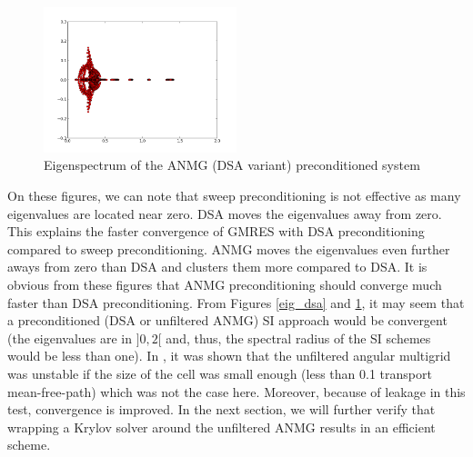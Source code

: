 \begin{figure}[H]
  \centering
  \includegraphics[width=0.5\textwidth]{./Anmg/red_eig_anmg}
  \caption{Eigenspectrum of the ANMG (DSA variant) preconditioned system}
  \label{eig_anmg}
\end{figure}
On these figures, we can note that sweep preconditioning is not effective as
many eigenvalues are located near zero. DSA moves the eigenvalues away from
zero. This explains the faster convergence of GMRES with DSA preconditioning
compared to sweep preconditioning. ANMG moves the eigenvalues even further
aways from zero than DSA and clusters them more compared to DSA. It is obvious
from these figures that ANMG preconditioning should converge much faster than
DSA preconditioning. From Figures \ref{eig_dsa} and \ref{eig_anmg}, it
  may seem that a preconditioned (DSA or unfiltered ANMG) SI approach
  would be convergent (the eigenvalues are in $]0,2[$ and, thus, the spectral
    radius of the SI schemes would be less than one). In
  \cite{shawn_phd}, it was shown that the unfiltered angular multigrid was
  unstable if the size of the cell was small enough (less than 0.1
  transport mean-free-path) which was not the case here. Moreover, because of
  leakage in this test, convergence is improved. In the next section, 
  we will further verify that wrapping a Krylov solver around the unfiltered ANMG
results in an efficient scheme.
